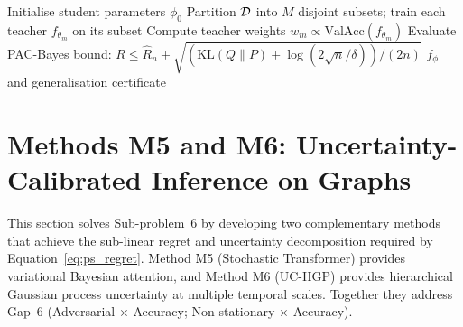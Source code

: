\begin{algorithm}[htbp]
\caption{MambaShield: Training with Progressive Adversarial Robustness Distillation}\label{alg:mamba}
Initialise student parameters $\phi_0$\;
Partition $\mathcal{D}$ into $M$ disjoint subsets; train each teacher $f_{\theta_m}$ on its subset\;
Compute teacher weights $w_m \propto \mathrm{ValAcc}(f_{\theta_m})$\;
Evaluate PAC-Bayes bound: $R \le \hat{R}_n + \sqrt{(\mathrm{KL}(Q\|P)+\log(2\sqrt{n}/\delta))/(2n)}$\;
\Return $f_\phi$ and generalisation certificate
\end{algorithm}


\section{Methods M5 and M6: Uncertainty-Calibrated Inference on Graphs}
\label{sec:stochastic}

This section solves Sub-problem~6 by developing two complementary methods that achieve the sub-linear regret and uncertainty decomposition required by Equation~\eqref{eq:ps_regret}. Method M5 (Stochastic Transformer) provides variational Bayesian attention, and Method M6 (UC-HGP) provides hierarchical Gaussian process uncertainty at multiple temporal scales. Together they address Gap~6 (Adversarial $\times$ Accuracy; Non-stationary $\times$ Accuracy).

